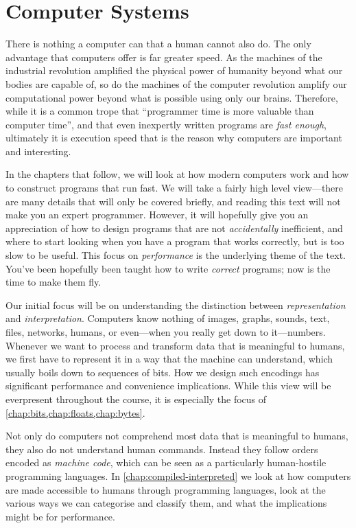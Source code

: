 \chapter{Computer Systems}
\label{chap:computers}

There is nothing a computer can that a human cannot also do.  The only
advantage that computers offer is far greater speed.  As the machines
of the industrial revolution amplified the physical power of humanity
beyond what our bodies are capable of, so do the machines of the
computer revolution amplify our computational power beyond what is
possible using only our brains.  Therefore, while it is a common trope
that ``programmer time is more valuable than computer time'', and that
even inexpertly written programs are \emph{fast enough}, ultimately it
is execution speed that is the reason why computers are important and
interesting.

In the chapters that follow, we will look at how modern computers work
and how to construct programs that run fast.  We will take a fairly
high level view---there are many details that will only be covered
briefly, and reading this text will not make you an expert programmer.
However, it will hopefully give you an appreciation of how to design
programs that are not \emph{accidentally} inefficient, and where to
start looking when you have a program that works correctly, but is too
slow to be useful.  This focus on \emph{performance} is the underlying
theme of the text.  You've been hopefully been taught how to write
\emph{correct} programs; now is the time to make them fly.

Our initial focus will be on understanding the distinction between
\emph{representation} and \emph{interpretation}.  Computers know
nothing of images, graphs, sounds, text, files, networks, humans, or
even---when you really get down to it---numbers.  Whenever we want to
process and transform data that is meaningful to humans, we
first have to represent it in a way that the machine can understand,
which usually boils down to sequences of bits.  How we design such
encodings has significant performance and convenience implications.
While this view will be everpresent throughout the course, it is
especially the focus of \cref{chap:bits,chap:floats,chap:bytes}.

Not only do computers not comprehend most data that is meaningful to
humans, they also do not understand human commands.  Instead they
follow orders encoded as \emph{machine code}, which can be seen as a
particularly human-hostile programming languages.  In
\cref{chap:compiled-interpreted} we look at how computers are made
accessible to humans through programming languages, look at the
various ways we can categorise and classify them, and what the
implications might be for performance.

